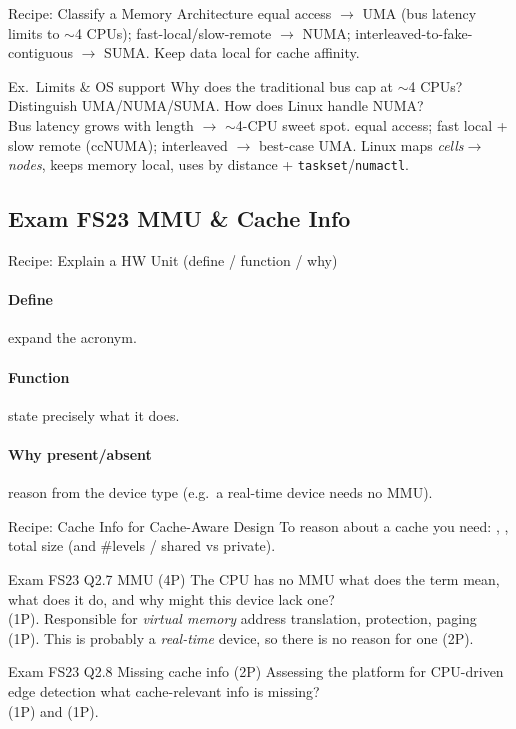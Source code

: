 \multend

\begin{KR}{Recipe: Classify a Memory Architecture}
    equal access $\to$ UMA (bus latency limits to $\sim$4 CPUs); fast-local/slow-remote $\to$ NUMA; interleaved-to-fake-contiguous $\to$ SUMA. Keep data local for cache affinity.
\end{KR}

\begin{example2}{Ex.\ Limits \& OS support}
    Why does the traditional bus cap at $\sim$4 CPUs? Distinguish UMA/NUMA/SUMA. How does Linux handle NUMA?
     \\ 
    Bus latency grows with length $\to$ $\sim$4-CPU sweet spot.  equal access;  fast local + slow remote (ccNUMA);  interleaved $\to$ best-case UMA. Linux maps \emph{cells}$\to$\emph{nodes}, keeps memory local, uses  by distance + \texttt{taskset}/\texttt{numactl}.
\end{example2}

\subsection{Exam FS23 MMU \& Cache Info}

\begin{KR}{Recipe: Explain a HW Unit (define / function / why)}
    \paragraph{Define} expand the acronym.
    \paragraph{Function} state precisely what it does.
    \paragraph{Why present/absent} reason from the device type (e.g.\ a real-time device needs no MMU).
\end{KR}

\begin{KR}{Recipe: Cache Info for Cache-Aware Design}
    To reason about a cache you need: , , total size (and \#levels / shared vs private).
\end{KR}

\begin{example2}{Exam FS23 Q2.7 MMU (4P)}
    The CPU has no MMU what does the term mean, what does it do, and why might this device lack one?
     \\ 
     (1P). Responsible for \emph{virtual memory} address translation, protection, paging (1P). This is probably a \emph{real-time} device, so there is no reason for one (2P).
\end{example2}

\begin{example2}{Exam FS23 Q2.8 Missing cache info (2P)}
    Assessing the platform for CPU-driven edge detection what cache-relevant info is missing?
     \\ 
     (1P) and  (1P).
\end{example2}
